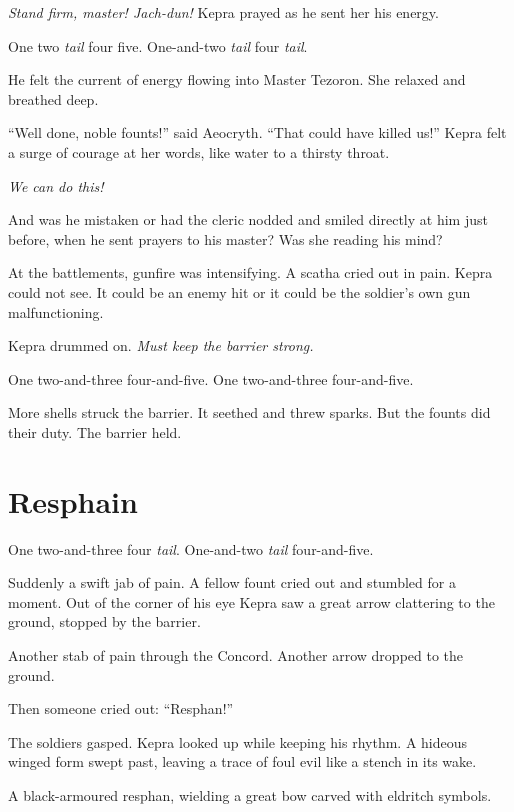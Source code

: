 \documentclass
  [a4paper,
   12pt,
   oneside
  ]%
  {article}
\newcommand{\drum}[1]{\textsf{#1}}
\begin{document}
\emph{Stand firm, master! Jach-dun!} Kepra prayed as he sent her his energy.

\drum{One two \emph{tail} four five. One-and-two \emph{tail} four \emph{tail}.}

He felt the current of energy flowing into Master Tezoron. She relaxed and breathed deep.

``Well done, noble founts!'' said Aeocryth. ``That could have killed us!'' 
Kepra felt a surge of courage at her words, like water to a thirsty throat. 

\emph{We can do this!}

And was he mistaken or had the cleric nodded and smiled directly at him just before, when he sent prayers to his master? 
Was she reading his mind?

At the battlements, gunfire was intensifying. A scatha cried out in pain. Kepra could not see. It could be an enemy hit or it could be the soldier’s own gun malfunctioning.

Kepra drummed on. 
\emph{Must keep the barrier strong.}

\drum{One two-and-three four-and-five. One two-and-three four-and-five.}

More shells struck the barrier. It seethed and threw sparks. But the founts did their duty. The barrier held.



\section{Resphain}
\drum{One two-and-three four \emph{tail}. One-and-two \emph{tail} four-and-five.}\nopagebreak

Suddenly a swift jab of pain. A fellow fount cried out and stumbled for a moment. Out of the corner of his eye Kepra saw a great arrow clattering to the ground, stopped by the barrier.

Another stab of pain through the Concord. 
Another arrow dropped to the ground.

Then someone cried out: ``Resphan!''

The soldiers gasped. Kepra looked up while keeping his rhythm. A hideous winged form swept past, leaving a trace of foul evil like a stench in its wake. 

A black-armoured resphan, wielding a great bow carved with eldritch symbols. 
\end{document}

